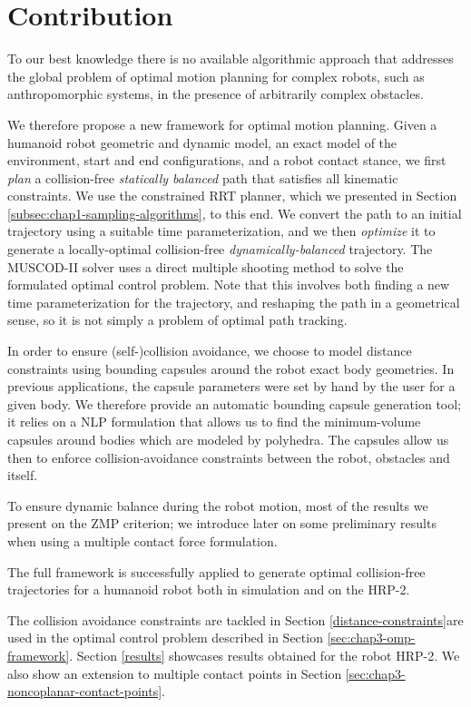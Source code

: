 \section{Contribution}
\label{sec:chap3-contribution}

To our best knowledge there is no available algorithmic approach that
addresses the global problem of optimal motion planning for complex
robots, such as anthropomorphic systems, in the presence of
arbitrarily complex obstacles.

We therefore propose a new framework for optimal motion
planning. Given a humanoid robot geometric and dynamic model, an exact
model of the environment, start and end configurations, and a robot
contact stance, we first \emph{plan} a collision-free \emph{statically
  balanced} path that satisfies all kinematic constraints. We use the
constrained RRT planner, which we presented in Section
\ref{subsec:chap1-sampling-algorithms}, to this end. We convert the
path to an initial trajectory using a suitable time parameterization,
and we then \emph{optimize} it to generate a locally-optimal
collision-free \emph{dynamically-balanced} trajectory. The
\textsc{MUSCOD-II} solver uses a direct multiple shooting method to
solve the formulated optimal control problem. Note that this involves
both finding a new time parameterization for the trajectory, and
reshaping the path in a geometrical sense, so it is not simply a
problem of optimal path tracking.

In order to ensure (self-)collision avoidance, we choose to model
distance constraints using bounding capsules around the robot exact
body geometries. In previous applications, the capsule parameters were
set by hand by the user for a given body. We therefore provide an
automatic bounding capsule generation tool; it relies on a NLP
formulation that allows us to find the minimum-volume capsules around
bodies which are modeled by polyhedra. The capsules allow us then to
enforce collision-avoidance constraints between the robot, obstacles
and itself.

To ensure dynamic balance during the robot motion, most of the results
we present on the ZMP criterion; we introduce later on some
preliminary results when using a multiple contact force formulation.

The full framework is successfully applied to generate optimal
collision-free trajectories for a humanoid robot both in simulation
and on the HRP-2.

The collision avoidance constraints are tackled in Section
\ref{distance-constraints}are used in the optimal control problem
described in Section \ref{sec:chap3-omp-framework}. Section
\ref{results} showcases results obtained for the robot HRP-2. We also
show an extension to multiple contact points in Section
\ref{sec:chap3-noncoplanar-contact-points}.

